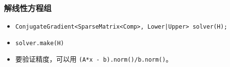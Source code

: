 \subsubsection{解线性方程组}
\begin{itemize}
\item \verb`ConjugateGradient<SparseMatrix<Comp>, Lower|Upper> solver(H);`
\item \verb|solver.make(H)|
\item 要验证精度，可以用 \verb|(A*x - b).norm()/b.norm()|。
\end{itemize}

